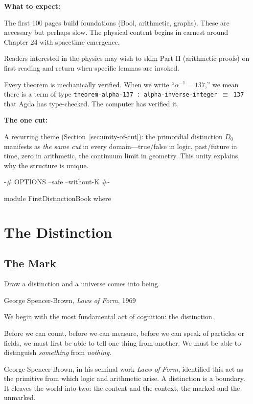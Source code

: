 \documentclass[11pt,a4paper]{book}
\begin{document}
\medskip

\noindent\textbf{What to expect:}

The first 100 pages build foundations (Bool, arithmetic, graphs). These are 
necessary but perhaps slow. The physical content begins in earnest around 
Chapter 24 with spacetime emergence.

Readers interested in the physics may wish to skim Part II (arithmetic proofs) 
on first reading and return when specific lemmas are invoked.

Every theorem is mechanically verified. When we write ``$\alpha^{-1} = 137$,'' 
we mean there is a term of type \texttt{theorem-alpha-137 : alpha-inverse-integer $\equiv$ 137} 
that Agda has type-checked. The computer has verified it.

\medskip

\noindent\textbf{The one cut:}

A recurring theme (Section~\ref{sec:unity-of-cut}): the primordial distinction $D_0$ 
manifests as \emph{the same cut} in every domain---true/false in logic, past/future 
in time, zero in arithmetic, the continuum limit in geometry. This unity explains 
why the structure is unique.

\begin{code}
{-# OPTIONS --safe --without-K #-}

module FirstDistinctionBook where
\end{code}

\tableofcontents
\mainmatter

\part{The Distinction}

\chapter{The Mark}

\epigraph{Draw a distinction and a universe comes into being.}{George Spencer-Brown, \textit{Laws of Form}, 1969}

We begin with the most fundamental act of cognition: the distinction.

Before we can count, before we can measure, before we can speak of particles or 
fields, we must first be able to tell one thing from another. We must be able 
to distinguish \emph{something} from \emph{nothing}.

George Spencer-Brown, in his seminal work \textit{Laws of Form}, identified 
this act as the primitive from which logic and arithmetic arise. A distinction 
is a boundary. It cleaves the world into two: the content and the context, 
the marked and the unmarked.
\end{document}
